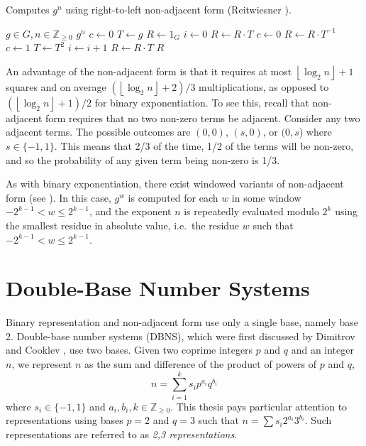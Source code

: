 \documentclass{ucalgthes1}
\theoremstyle{definition}
\newcommand{\ZZgez}{\mathbb{Z}_{\ge 0}}
\newcommand{\floor}[1]{\left\lfloor #1 \right\rfloor}
\begin{document}
\begin{algorithm}[htb]
\caption{Computes $g^n$ using right-to-left non-adjacent form (Reitwiesner \cite{reitwiesner1960}).}
\label{alg:nafR2LImmutable}
\begin{algorithmic}[1]
\Require $g \in G, n \in \ZZgez$
\Ensure $g^n$
\State $c \gets 0$ 
\State $T \gets g$ 
\State $R \gets 1_G$
\State $i \gets 0$
	\If {$\floor{n/2^i}+c \equiv 1 \pmod 4$}
		\State $R \gets R \cdot T$
		\State $c \gets 0$
	\ElsIf {$\floor{n/2^i}+c \equiv 3 \pmod 4$}
		\State $R \gets R \cdot T^{-1}$
		\State $c \gets 1$
	\EndIf
	\State $T \gets T^2$
	\State $i \gets i+1$
\EndWhile
{} \State $R \gets R \cdot T$ \EndIf
\State \Return $R$
\end{algorithmic}
\end{algorithm}

An advantage of the non-adjacent form is that it requires at most $\floor{\log_2 n}+1$ squares and on average $(\floor{\log_2 n}+2)/3$ multiplications, as opposed to $(\floor{\log_2 n}+1)/2$ for binary exponentiation.  To see this, recall that non-adjacent form requires that no two non-zero terms be adjacent.  Consider any two adjacent terms.  The possible outcomes are $(0,0)$, $(s, 0)$, or $(0, s$) where $s \in \{-1, 1\}$. This means that 2/3 of the time, 1/2 of the terms will be non-zero, and so the probability of any given term being non-zero is 1/3.

As with binary exponentiation, there exist windowed variants of non-adjacent form (see \cite[Algorithm~9.20.~p.153]{Cohen2006}).   In this case, $g^w$ is computed for each $w$ in some window $-2^{k-1} < w \le 2^{k-1}$, and the exponent $n$ is repeatedly evaluated modulo $2^k$ using the smallest residue in absolute value, i.e.\ the residue $w$ such that $-2^{k-1} < w \le 2^{k-1}$.

\section{Double-Base Number Systems}
\label{sec:dbns}

Binary representation and non-adjacent form use only a single base, namely base 2.  Double-base number systems (DBNS), which were first discussed by Dimitrov and Cooklev \cite{Dimitrov1995a, Dimitrov1995b}, use two bases.  Given two coprime integers $p$ and $q$ and an integer $n$, we represent $n$ as the sum and difference of the product of powers of $p$ and $q$,
\begin{equation}\label{eq:generalDbnsForm}
	n = \sum_{i=1}^k s_i p^{a_i} q^{b_i}
\end{equation}
where $s_i \in \{-1, 1\}$ and $a_i, b_i, k \in \ZZgez$. This thesis pays particular attention to representations using bases $p=2$ and $q=3$ such that $n = \sum s_i 2^{a_i} 3^{b_i}$.  Such representations are referred to as \emph{2,3 representations}.
\end{document}
